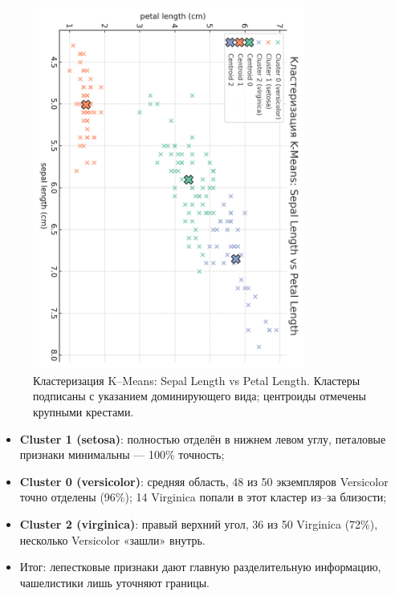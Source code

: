 \begin{figure}[H]
  \centering
  \includegraphics[width=0.8\textwidth]{images/cluster_plot_cb2.png}
  \caption{Кластеризация K–Means: Sepal Length vs Petal Length. Кластеры подписаны с указанием доминирующего вида; центроиды отмечены крупными крестами.}
  \label{fig:kmeans_cb2}
\end{figure}

\begin{itemize}
  \item \textbf{Cluster 1 (setosa)}: полностью отделён в нижнем левом углу, петаловые признаки минимальны — 100\% точность;
  \item \textbf{Cluster 0 (versicolor)}: средняя область, 48 из 50 экземпляров Versicolor точно отделены (96\%); 14 Virginica попали в этот кластер из–за близости;
  \item \textbf{Cluster 2 (virginica)}: правый верхний угол, 36 из 50 Virginica (72\%), несколько Versicolor «зашли» внутрь.
  \item Итог: лепестковые признаки дают главную разделительную информацию, чашелистики лишь уточняют границы.
\end{itemize}


